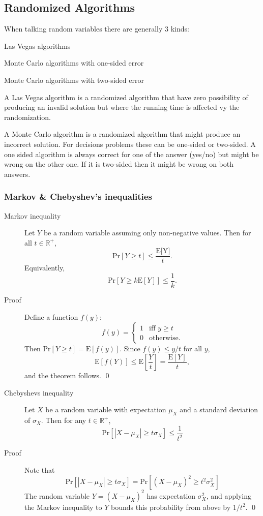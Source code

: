 \subsection{Randomized Algorithms}

When talking random variables there are generally 3 kinds:
\begin{enumerate*}
  \item Las Vegas algorithms
  \item Monte Carlo algorithms with one-sided error
  \item Monte Carlo algorithms with two-sided error
\end{enumerate*}

A Las Vegas algorithm is a randomized algorithm that have zero possibility of
producing an invalid solution but where the running time is affected vy the
randomization.

A Monte Carlo algorithm is a randomized algorithm that might produce an
incorrect solution. For decisions problems these can be one-sided or
two-sided. A one sided algorithm is always correct for one of the answer
(yes/no) but might be wrong on the other one. If it is two-sided then it might
be wrong on both answers.


\subsubsection{Markov \& Chebyshev's inequalities}
\begin{description}
\item[Markov inequality] Let $Y$ be a random variable assuming only non-negative
  values. Then for all $t \in \mathbb{R}^+$,
  \[
    \text{Pr}[Y \geq t] \leq \frac{\text{E[Y]}}{t}.
  \]
  Equivalently,
  \[
    \text{Pr}[Y \geq k\text{E}[Y]] \leq \frac{1}{k}.
  \]
\item[Proof] Define a function $f(y)$:
  \[
   f(y) = \begin{cases}
     1 & \text{iff } y \geq t\\
     0 & \text{otherwise.}
   \end{cases}
  \]
  Then $\text{Pr}[Y \geq t] = \text{E}[f(y)]$. Since $f(y) \leq y/t$ for all $y$,
  \[
    \text{E}[f(Y)] \leq \text{E}\left [\frac{Y}{t} \right ] = \frac{\text{E}[Y]}{t},
  \]
  and the theorem follows. \qed
\end{description}

\begin{description}
\item[Chebyshevs inequality] Let $X$ be a random variable with expectation
  $\mu_X$ and a standard deviation of $\sigma_X$. Then for any $t \in
  \mathbb{R}^+$,
  \[
    \text{Pr}[|X - \mu_X| \geq t\sigma_X] \leq \frac{1}{t^2}
  \]
\item[Proof] Note that
  \[
    \text{Pr}[|X - \mu_X| \geq t\sigma_X] = \text{Pr}[(X - \mu_X)^2 \geq
    t^2\sigma_X^2]
  \]
  The random variable $Y = (X - \mu_X)^2$ has expectation $\sigma_X^2$, and
  applying the Markov inequality to $Y$ bounds this probability from above by
  $1/t^2$. \qed
\end{description}


